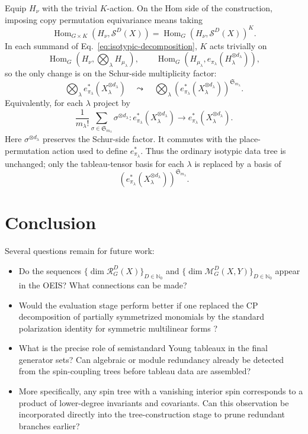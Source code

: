 \documentclass[11pt]{article}
\newcommand{\dsN}{\mathbb{N}}
\newcommand{\scM}{\mathcal{M}}
\newcommand{\scR}{\mathcal{R}}
\newcommand{\scS}{\mathcal{S}}
\newcommand{\HomG}[2]{\operatorname{Hom}_G\!\left(#1,#2\right)}
\theoremstyle{definition}
\begin{document}
Equip $H_\nu$ with the trivial $K$-action.
On the Hom side of the construction, imposing copy permutation equivariance means taking
\[
  \operatorname{Hom}_{G\times K}\!\left(H_\nu,\scS^D(X)\right)
  =
  \HomG{H_\nu}{\scS^D(X)}^K.
\]
In each summand of Eq.~\eqref{eq:isotypic-decomposition}, $K$ acts trivially on
\[
  \HomG{H_\nu}{\bigotimes_\lambda H_{\mu_\lambda}},
  \qquad
  \HomG{H_{\mu_\lambda}}{e_{\pi_\lambda}(H_\lambda^{\otimes d_\lambda})},
\]
so the only change is on the Schur-side multiplicity factor:
\[
  \bigotimes_\lambda e_{\pi_\lambda}^*(X_\lambda^{\otimes d_\lambda})
  \quad\leadsto\quad
  \bigotimes_\lambda
  \left(e_{\pi_\lambda}^*(X_\lambda^{\otimes d_\lambda})\right)^{\mathfrak S_{m_\lambda}}.
\]
Equivalently, for each $\lambda$ project by
\[
  \frac{1}{m_\lambda!}
  \sum_{\sigma\in\mathfrak S_{m_\lambda}}
  \sigma^{\otimes d_\lambda}
  :
  e_{\pi_\lambda}^*(X_\lambda^{\otimes d_\lambda})
  \longrightarrow
  e_{\pi_\lambda}^*(X_\lambda^{\otimes d_\lambda}).
\]
Here $\sigma^{\otimes d_\lambda}$ preserves the Schur-side factor.
It commutes with the place-permutation action used to define $e_{\pi_\lambda}^*$.
Thus the ordinary isotypic data tree is unchanged; only the tableau-tensor basis for each $\lambda$ is replaced by a basis of
\[
  \left(e_{\pi_\lambda}^*(X_\lambda^{\otimes d_\lambda})\right)^{\mathfrak S_{m_\lambda}}.
\]

\section{Conclusion}\label{sec:conclusion}

Several questions remain for future work:
\begin{itemize}[leftmargin=2em]
  \item Do the sequences $\{\dim \scR_G^D(X)\}_{D \in \dsN_0}$ and $\{\dim \scM_G^D(X,Y)\}_{D \in \dsN_0}$ appear in the OEIS?
  What connections can be made?
  \item Would the evaluation stage perform better if one replaced the CP decomposition of partially symmetrized monomials by the standard polarization identity for symmetric multilinear forms \cite[Theorem~1 and Eq.~(7)]{Thomas2014}?
  \item What is the precise role of semistandard Young tableaux in the final generator sets?
  Can algebraic or module redundancy already be detected from the spin-coupling trees before tableau data are assembled?
  \item More specifically, any spin tree with a vanishing interior spin corresponds to a product of lower-degree invariants and covariants.
  Can this observation be incorporated directly into the tree-construction stage to prune redundant branches earlier?
\end{itemize}
\end{document}
